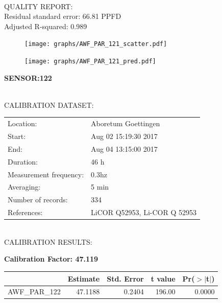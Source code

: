 \documentclass[oneside]{report}
\begin{document}
\hrulefill\\
QUALITY REPORT:\\
Residual standard error: 66.81 PPFD\\
Adjusted R-squared: 0.989



\begin{figure}[H]
  \centering
  \texttt{[image: graphs/AWF\_PAR\_121\_scatter.pdf]}
\end{figure}




\begin{figure}[H]
  \centering
  \texttt{[image: graphs/AWF\_PAR\_121\_pred.pdf]}
\end{figure}

\pagebreak


\begin{center}
\large{\textbf{SENSOR:122}}\\
\end{center}

\hrulefill\\
CALIBRATION DATASET:\\
\begin{table}[h!]
  \centering
  \label{tab:table1}
  \begin{tabular}{ll}
    Location: & Aboretum Goettingen\\ 
    
    
    Start:  & Aug 02 15:19:30 2017 \\
    End:   & Aug 04 13:15:00 2017\\ 
    Duration: & 46 h\\
    Measurement frequency: & 0.3hz\\
    Averaging:  &5 min\\
    Number of records: & 334 \\
    References: & LiCOR Q52953, Li-COR Q 52953 \\
  \end{tabular}
\end{table}

\hrulefill\\
CALIBRATION RESULTS:\\


\begin{center}
\textbf{\large{Calibration Factor: 47.119}}\\
\end{center}
\begin{table}[ht]
\centering
\begin{tabular}{rrrrr}
  \hline
 & Estimate & Std. Error & t value & Pr($>$$|$t$|$) \\ 
  \hline
AWF\_PAR\_122 & 47.1188 & 0.2404 & 196.00 & 0.0000 \\ 
   \hline
\end{tabular}
\end{table}
\end{document}
